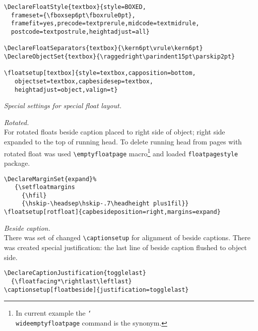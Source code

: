 \documentclass{book}
\providecommand*\rightlast{\leftskip0ptplus1fil
  \rightskip0ptplus-1fil\parfillskip0ptplus1fil}
\providecommand*\leftlast{\leftskip0pt\rightskip0pt\parfillskip0ptplus1fil}
\providecommand*{\pkg}[1]{\texttt{#1}}
\providecommand*{\com}[1]{\texttt{\char`\\#1}}
\begin{document}
\begin{sl}
\begin{verbatim}
\DeclareFloatStyle{textbox}{style=BOXED,
  frameset={\fboxsep6pt\fboxrule0pt},
  framefit=yes,precode=textprerule,midcode=textmidrule,
  postcode=textpostrule,heightadjust=all}

\DeclareFloatSeparators{textbox}{\kern6pt\vrule\kern6pt}
\DeclareObjectSet{textbox}{\raggedright\parindent15pt\parskip2pt}

\floatsetup[textbox]{style=textbox,capposition=bottom,
   objectset=textbox,capbesidesep=textbox,
   heightadjust=object,valign=t}
\end{verbatim}

\emph{Special settings for special float layout.}

\emph{Rotated.}\\
For rotated floats beside caption placed to right side of object;
right side expanded to the top of running head. To delete running head from pages
with rotated float was used \verb|\emptyfloatpage| macro\footnote{In current example the
\protect\com{wideemptyfloatpage} command is the synonym.} and
loaded \pkg{floatpagestyle} package.
\begin{verbatim}
\DeclareMarginSet{expand}%
   {\setfloatmargins
     {\hfil}
     {\hskip-\headsep\hskip-.7\headheight plus1fil}}
\floatsetup[rotfloat]{capbesideposition=right,margins=expand}
\end{verbatim}

\emph{Beside caption.}\\
There was set of changed \verb|\captionsetup| for alignment of beside captions.
There was created special justification: the last line of beside caption flushed to
object side.
\begin{verbatim}
\DeclareCaptionJustification{togglelast}
  {\floatfacing*\rightlast\leftlast}
\captionsetup[floatbeside]{justification=togglelast}
\end{verbatim}

\end{sl}


\end{document}
